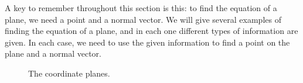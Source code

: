 A key to remember throughout this section is this: to find the equation of a plane, we need a point and a normal vector. We will give several examples of finding the equation of a plane, and in each one different types of information are given. In each case, we need to use the given information to find a point on the plane and a normal vector.

\begin{figure}[H]
\centering
\centerline{
\hspace{0.1cm}
\hspace{0.1cm}
}
\caption{The coordinate planes. }
\label{fig_ana_geo_4}
\end{figure}


